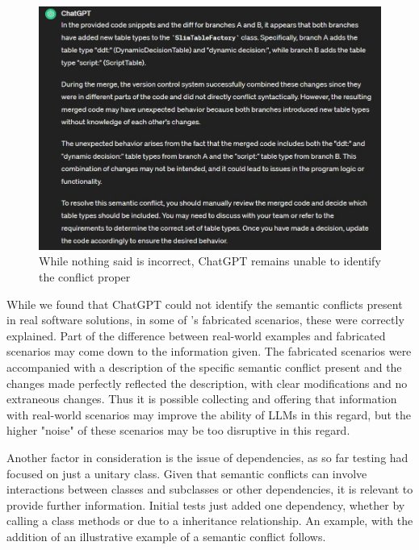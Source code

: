 \begin{figure}
    \centering
    \includegraphics[width=1\linewidth]{figures/almostsemantic.jpg}
    \caption{While nothing said is incorrect, ChatGPT remains unable to identify the conflict proper}
    \label{fig:cantfind}
\end{figure}

While we found that ChatGPT could not identify the semantic conflicts present in real software solutions, in some of \citet{kn:nuno}'s fabricated scenarios, these were correctly explained. Part of the difference between real-world examples and fabricated scenarios may come down to the information given. The fabricated scenarios were accompanied with a description of the specific semantic conflict present and the changes made perfectly reflected the description, with clear modifications and no extraneous changes. Thus it is possible collecting and offering that information with real-world scenarios may improve the ability of LLMs in this regard, but the higher "noise" of these scenarios may be too disruptive in this regard.

Another factor in consideration is the issue of dependencies, as so far testing had focused on just a unitary class. Given that semantic conflicts can involve interactions between classes and subclasses or other dependencies, it is relevant to provide further information. Initial tests just added one dependency, whether by calling a class methods or due to a inheritance relationship. An example, with the addition of an illustrative example of a semantic conflict follows.

